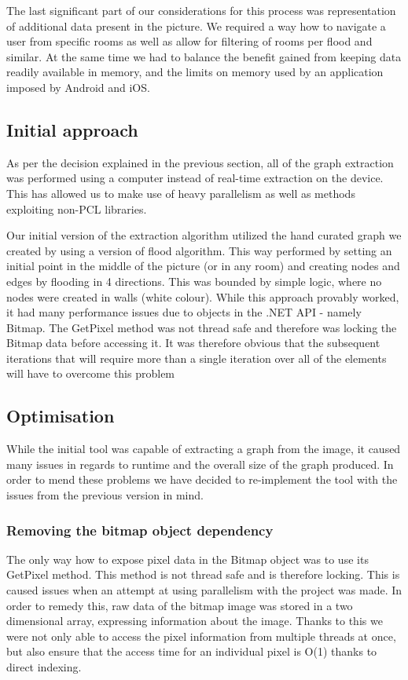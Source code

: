 \documentclass[main.tex]{subfiles}
\begin{document}
The last significant part of our considerations for this process was representation of additional data present in the picture. We required a way how to navigate a user from specific rooms as well as allow for filtering of rooms per flood and similar. At the same time we had to balance the benefit gained from keeping data readily available in memory, and the limits on memory used by an application imposed by Android and iOS.
	\subsection{Initial approach}
	As per the decision explained in the previous section, all of the graph extraction was performed using a computer instead of real-time extraction on the device. This has allowed us to make use of heavy parallelism as well as methods exploiting non-PCL  libraries.
	\newline
	
Our initial version of the extraction algorithm utilized the hand curated graph we created by using a version of flood algorithm. This way performed by setting an initial point in the middle of the picture (or in any room)  and creating nodes and edges by flooding in 4 directions. This was bounded by simple logic, where no nodes were created in walls (white colour). While this approach provably worked, it had many performance issues due to objects in the .NET API - namely Bitmap. The GetPixel method was not thread safe and therefore was locking the Bitmap data before accessing it. It was therefore obvious that the subsequent iterations that will require more than a single iteration over all of the elements will have to overcome this problem
	\subsection{Optimisation}
	While the initial tool was capable of extracting a graph from the image, it caused many issues in regards to runtime and the overall size of the graph produced. In order to mend these problems we have decided to re-implement the tool with the issues from the previous version in mind. 
	\subsubsection{Removing the bitmap object dependency}
	The only way how to expose pixel data in the Bitmap object was to use its GetPixel method. This method is not thread safe and is therefore locking. This is caused issues when an attempt at using parallelism with the project was made. In order to remedy this, raw data of the bitmap image was stored in a two dimensional array, expressing information about the image. Thanks to this we were not only able to access the pixel information from multiple threads at once, but also ensure that the access time for an individual pixel is O(1) thanks to direct indexing. 
\end{document}
